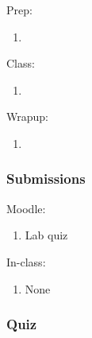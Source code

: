\documentclass[12pt]{article}
\begin{document}
Prep:
\begin{enumerate}
\item
\end{enumerate}

\noindent
Class:
\begin{enumerate}
\item
\end{enumerate}

\noindent
Wrapup:
\begin{enumerate}
\item
\end{enumerate}

\subsubsection{Submissions}

Moodle:
\begin{enumerate}
\item Lab quiz
\end{enumerate}

\noindent
In-class:
\begin{enumerate}
\item None
\end{enumerate}


\subsubsection{Quiz}
\end{document}
